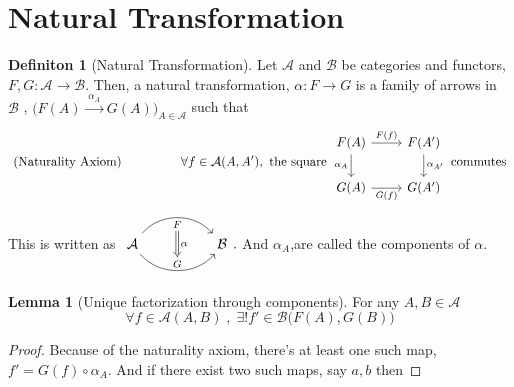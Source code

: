 \documentclass{article}
\theoremstyle{definition}
\theoremstyle{definition}
\newtheorem{definition}{Definiton}[section]
\theoremstyle{definition}
\newtheorem{lemma}{Lemma}[section]
\theoremstyle{definition}
\begin{document}
\section{Natural Transformation}
\label{sec:Natural Transformation}
\begin{definition}[Natural Transformation] %
	Let $\mathcal{A} $ and $\mathcal{B} $ be categories and functors, $F,G: \mathcal{A} \rightarrow \mathcal{B} $. Then, a natural transformation, $\alpha : F\rightarrow G$ is a family of arrows in $\mathcal{B}$ , $\big( F(A) \xrightarrow{ \; \alpha_A \; } G(A) \big)_{A\in \mathcal{A} }$ such that
	\[
		\text{ (Naturality Axiom) \hspace{4em} }\forall f \in \mathcal{A}(A,A'), \text{ the square }
		\begin{tikzcd}
			F(A) \arrow[swap]{d}{\alpha_A} \arrow{r}{F(f)} & F(A') \arrow{d}{\alpha_{A'}}  \\
			G(A) \arrow[swap]{r}{G(f)} & G(A')
		\end{tikzcd}
	\text{ commutes }\]
	This is written as
	$\begin{tikzcd}[row sep=large, column sep=huge]
		\mathcal{A} \arrow[r, bend left=50, "F"{name=U, below}]
		\arrow[r, bend right = 50, "G"{name=D, above}]
			& \mathcal{B}
			\arrow[Rightarrow, from=U , to=D, "\alpha"]
	\end{tikzcd}.$ And $\alpha_A$,are called the components of $\alpha$.
\end{definition}
\begin{lemma}[Unique factorization through components] For any $A,B \in \mathcal{A} $
	\[ \forall f \in \mathcal{A} (A,B) \; , \; \exists! f' \in \mathcal{B} \big(F(A),G(B)\big)   \]
	\begin{proof}
		Because of the naturality axiom, there's at least one such map, $f'=G(f) \circ \alpha_A$. And if there exist two such maps, say $a,b$ then
	\end{proof}
\end{lemma}
\end{document}
